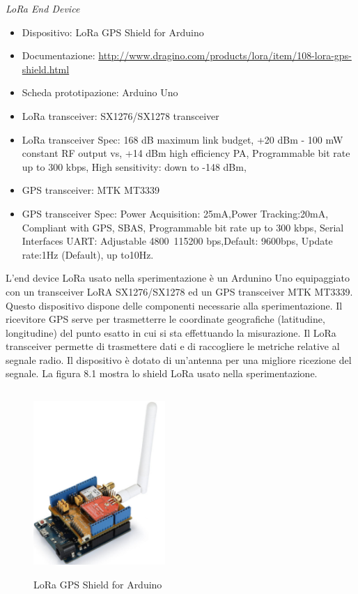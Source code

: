 \documentclass[12pt,a4paper,openright,twoside]{report}
\begin{document}
\textit{LoRa End Device}
\begin{itemize}
    \item Dispositivo: LoRa GPS Shield for Arduino
    \item Documentazione: \url{http://www.dragino.com/products/lora/item/108-lora-gps-shield.html}
    \item Scheda prototipazione: Arduino Uno
    \item LoRa transceiver: SX1276/SX1278 transceiver
    \item LoRa transceiver Spec: 168 dB maximum link budget, +20 dBm - 100 mW constant RF output vs, +14 dBm high efficiency PA, Programmable bit rate up to 300 kbps, High sensitivity: down to -148 dBm, 
    \item GPS transceiver: MTK MT3339
    \item GPS transceiver Spec: Power Acquisition: 25mA,Power Tracking:20mA, Compliant with GPS, SBAS, Programmable bit rate up to 300 kbps, Serial Interfaces UART: Adjustable 4800~115200 bps,Default: 9600bps, Update rate:1Hz (Default), up to10Hz.
\end{itemize}

L'end device LoRa usato nella sperimentazione \`e un Ardunino Uno equipaggiato con un transceiver LoRA SX1276/SX1278 ed un GPS transceiver MTK MT3339. Questo dispositivo dispone delle componenti necessarie alla sperimentazione. Il ricevitore GPS serve per trasmetterre le coordinate geografiche (latitudine, longitudine) del punto esatto in cui si sta effettuando la misurazione. Il LoRa transceiver permette di trasmettere dati e di raccogliere le metriche relative al segnale radio. Il dispositivo \`e dotato di un'antenna per una migliore ricezione del segnale. La figura 8.1 mostra lo shield LoRa usato nella sperimentazione.  

\begin{figure}[h]                      
\begin{center} 
\includegraphics[width=50mm,height=70mm]{LoRa_Shield.png}
\caption[LoRa GPS Shield for Arduino]{LoRa GPS Shield for Arduino}\label{fig:prima}
\end{center}
\end{figure}
\end{document}

